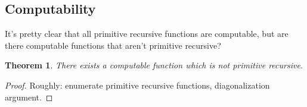 \documentclass[11pt]{article}
\theoremstyle{plain}
\newtheorem{thm}{Theorem}
\theoremstyle{definition}
\begin{document}
\subsection{Computability}

It's pretty clear that all primitive recursive functions are computable, but are there computable functions that 
aren't primitive recursive?

\begin{thm}
    There exists a computable function which is not primitive recursive.
\end{thm}
\begin{proof}
    Roughly: enumerate primitive recursive functions, diagonalization argument.
\end{proof}
\end{document}

